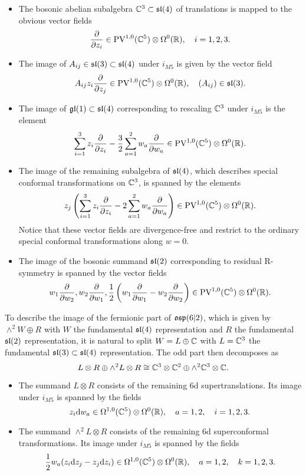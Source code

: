 \begin{itemize}
\item
The bosonic abelian subalgebra $\mathbb{C}^3 \subset \mathfrak{sl}(4)$ of translations is mapped to the obvious vector fields 
\[
\frac{\partial}{\partial z_i} \in \text{PV}^{1,0}(\mathbb{C}^5) \otimes \Omega^0(\mathbb{R}) , \quad i=1,2,3.
\]

\item
The image of $A_{ij}\in \mathfrak{sl}(3) \subset \mathfrak{sl}(4)$ under $i_{M5}$ is given by the vector field
\[
A_{ij} z_i \frac{\partial}{\partial z_j} \in \text{PV}^{1,0}(\mathbb{C}^5)\otimes \Omega^0(\mathbb{R}) , \quad (A_{ij}) \in \mathfrak{sl}(3) .
\]

\item
The image of  $\mathfrak{gl}(1) \subset \mathfrak{sl}(4)$ corresponding to rescaling $\mathbb{C}^3$ under $i_{M5}$ is the element
\[
\sum_{i=1}^3 z_i \frac{\partial}{\partial z_i} - \frac32 \sum_{a=1}^2 w_a \frac{\partial}{\partial w_a} \in \text{PV}^{1,0}(\mathbb{C}^5) \otimes \Omega^0(\mathbb{R})  .
\] 

\item 
The image of the remaining subalgebra of $\mathfrak{sl}(4)$, which describes special conformal transformations on $\mathbb{C}^3$, is spanned by the elements
\[
z_j \left(\sum_{i=1}^3 z_i \frac{\partial}{\partial z_i} - 2 \sum_{a=1}^2 w_a \frac{\partial}{\partial w_a} \right) \in \text{PV}^{1,0}(\mathbb{C}^5) \otimes \Omega^0(\mathbb{R}) .
\] 
Notice that these vector fields are divergence-free and restrict to the ordinary special conformal transformations along $w=0$. 
\item 
The image of the bosonic summand $\mathfrak{sl}(2)$ corresponding to residual R-symmetry is spanned by the vector fields
\[
w_1 \frac{\partial}{\partial w_2}, w_2 \frac{\partial}{\partial w_1}, \frac12 \left(w_1 \frac{\partial}{\partial w_1} - w_2 \frac{\partial}{\partial w_2}\right) \in \text{PV}^{1,0}(\mathbb{C}^5) \otimes \Omega^0(\mathbb{R}) .
\]
\end{itemize}

To describe the image of the fermionic part of $\mathfrak{osp}(6|2)$, which is given by $\wedge^2 W \oplus R$ with $W$ the fundamental $\mathfrak{sl}(4)$ representation and $R$ the fundamental $\mathfrak{sl}(2)$ representation, it is natural to split $W = L \oplus \mathbb{C}$ with $L = \mathbb{C}^3$ the fundamental $\mathfrak{sl}(3) \subset \mathfrak{sl}(4)$ representation. 
The odd part then decomposes as
\[
L \otimes R \oplus \wedge^2 L \otimes R \cong \mathbb{C}^3 \otimes \mathbb{C}^2 \oplus \wedge^2 \mathbb{C}^3 \otimes \mathbb{C} .
\]

\begin{itemize} 
\item The summand $L \otimes R$ consists of the remaining 6d supertranslations. Its image under $i_{M5}$ is spanned by the fields
\[
z_i \mathrm{d} w_a \in \Omega^{1,0}(\mathbb{C}^5) \otimes \Omega^0(\mathbb{R}) ,\quad a=1,2, \quad i =1,2,3.
\] 

\item The summand $\wedge^2 L \otimes R$ consists of the remaining 6d superconformal transformations. Its image under $i_{M5}$ is spanned by the fields
\[
\frac12 w_a (z_i \mathrm{d} z_j - z_j \mathrm{d} z_i) \in \Omega^{1,0}(\mathbb{C}^5)\otimes \Omega^0(\mathbb{R}) , \quad a = 1,2, \quad k = 1,2,3. 
\]
\end{itemize}

